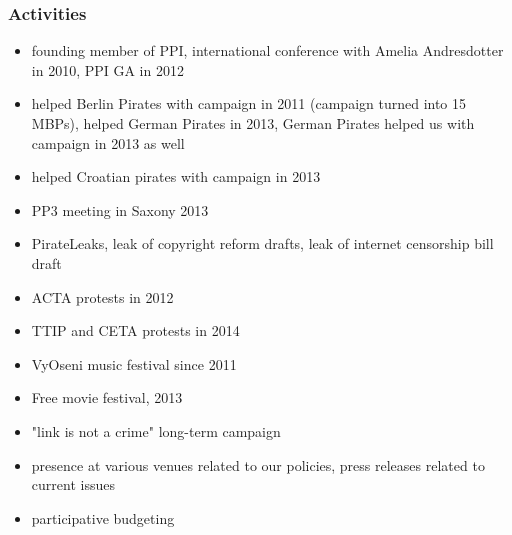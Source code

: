 \begin{frame}
	\frametitle{Activities}
	\begin{itemize}
		\item founding member of PPI, international conference with Amelia Andresdotter in 2010, PPI GA in 2012
		\item helped Berlin Pirates with campaign in 2011 (campaign turned into 15 MBPs), helped German Pirates in 2013, German Pirates helped us with campaign in 2013 as well
		\item helped Croatian pirates with campaign in 2013
		\item PP3 meeting in Saxony 2013
		\item PirateLeaks, leak of copyright reform drafts, leak of internet censorship bill draft
		\item ACTA protests in 2012
		\item TTIP and CETA protests in 2014
		\item VyOseni music festival since 2011
		\item Free movie festival, 2013
		\item "link is not a crime" long-term campaign
		\item presence at various venues related to our policies, press releases related to current issues
		\item participative budgeting
	\end{itemize}
\end{frame}
